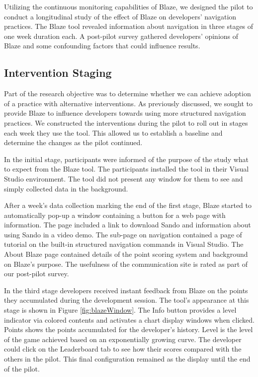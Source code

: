 \documentclass{sig-alternate}
\begin{document}
Utilizing the continuous monitoring capabilities of Blaze, we designed the pilot to conduct a longitudinal study of the effect of Blaze on developers' navigation practices.  The Blaze tool revealed information about navigation in three stages of one week duration each.  A post-pilot survey gathered developers' opinions of Blaze and some confounding factors that could influence results.

\subsection{Intervention Staging}

Part of the research objective was to determine whether we can achieve adoption of a practice with alternative interventions.  As previously discussed, we sought to provide Blaze to influence developers towards using more structured navigation practices.  We constructed the interventions during the pilot to roll out in stages each week they use the tool.  This allowed us to establish a baseline and determine the changes as the pilot continued.

In the initial stage, participants were informed of the purpose of the study what to expect from the Blaze tool.  The participants installed the tool in their Visual Studio environment.  The tool did not present any window for them to see and simply collected data in the background.   

After a week's data collection marking the end of the first stage, Blaze started to automatically pop-up a window containing a button for a web page with information.  The page included a link to download Sando  and information about using Sando in a video demo.  The sub-page on navigation contained a page of tutorial on the built-in structured navigation commands in Visual Studio.  The About Blaze page contained details of the point scoring system and background on Blaze's purpose.  The usefulness of the communication site is rated as part of our post-pilot  survey.

In the third stage developers received instant feedback from Blaze on the points they accumulated during the development session.  The tool's appearance at this stage is shown in Figure \ref{fig:blazeWindow}.  The Info button provides a level indicator via colored contents and activates a chart display windows when clicked.  Points shows the points accumulated for the developer's history.  Level is the level of the game achieved based on an exponentially growing curve.   The developer could click on the Leaderboard tab to see how their scores compared with the others in the pilot.  This final configuration remained as the display until the end of the pilot.  
\end{document}

